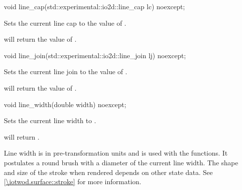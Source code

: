 \begin{itemdecl}
void line_cap(std::experimental::io2d::line_cap lc) noexcept;
\end{itemdecl}
\begin{itemdescr}
	\pnum
	\effects
	Sets the current line cap to the value of .
		
	\pnum
	\postconditions
	 will return the value of .
\end{itemdescr}

\begin{itemdecl}
void line_join(std::experimental::io2d::line_join lj) noexcept;
\end{itemdecl}
\begin{itemdescr}
	\pnum
	\effects
	Sets the current line join to the value of .
	
	\pnum
	\postconditions
	 will return the value of .
\end{itemdescr}

\begin{itemdecl}
void line_width(double width) noexcept;
\end{itemdecl}
\begin{itemdescr}
	\pnum
	\effects
	Sets the current line width to .
	
	\pnum
	\postconditions
	 will return .
	
	\pnum
	\remarks
	Line width is in pre-transformation units and is used with the  functions. It postulates a round brush with a diameter of the current line width. The shape and size of the stroke when rendered depends on other state data. See \ref{\iotwod.surface::stroke} for more information.
\end{itemdescr}

